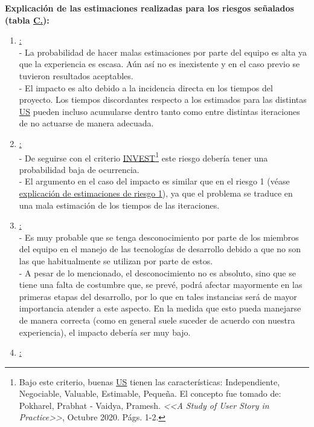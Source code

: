 \documentclass[a4paper, 12pt,twoside]{report}  %
\numberwithin{equation}{subsection} %
\begin{document}
\textbf{Explicación de las estimaciones realizadas para los riesgos señalados (tabla \hyperref[tabla_riesgos]{C.\tempTblRiesgos}):}
\begin{enumerate}
	\item \underline{\hypertarget{explicacion_estimacion_riesgo_uno}{}:}\\
	- La probabilidad de hacer malas estimaciones por parte del equipo es alta ya que la experiencia es escasa. Aún así no es inexistente y en el caso previo se tuvieron resultados aceptables.\\
	- El impacto es alto debido a la incidencia directa en los tiempos del proyecto. Los tiempos discordantes respecto a los estimados para las distintas \hyperlink{US}{US} pueden incluso acumularse dentro tanto como entre distintas iteraciones de no actuarse de manera adecuada.
	\item \underline{:}\\
	- De seguirse con el criterio \hyperlink{INVEST}{INVEST}\footnote{Bajo este criterio, buenas \hyperlink{US}{US} tienen las características: Independiente, Negociable, Valuable, Estimable, Pequeña. El concepto fue tomado de: Pokharel, Prabhat - Vaidya, Pramesh. \textit{<<A Study of User Story in Practice>>}, Octubre 2020. Págs. 1-2.} este riesgo debería tener una probabilidad baja de ocurrencia.\\
	- El argumento en el caso del impacto es similar que en el riesgo 1 (véase \hyperlink{explicacion_estimacion_riesgo_uno}{explicación de estimaciones de riesgo 1}), ya que el problema se traduce en una mala estimación de los tiempos de las iteraciones.
	\item \underline{:}\\
	- Es muy probable que se tenga desconocimiento por parte de los miembros del equipo en el manejo de las tecnologías de desarrollo debido a que no son las que habitualmente se utilizan por parte de estos.\\
	- A pesar de lo mencionado, el desconocimiento no es absoluto, sino que se tiene una falta de costumbre que, se prevé, podrá afectar mayormente en las primeras etapas del desarrollo, por lo que en tales instancias será de mayor importancia atender a este aspecto. En la medida que esto pueda manejarse de manera correcta (como en general suele suceder de acuerdo con nuestra experiencia), el impacto debería ser muy bajo.
	\item \underline{:}\\

\end{enumerate}
\end{document}
